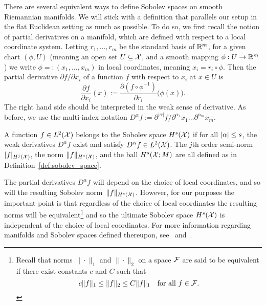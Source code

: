There are several equivalent ways to define Sobolev spaces on smooth Riemannian manifolds. We will stick with a definition that parallels our setup in the flat Euclidean setting as much as possible. To do so, we first recall the notion of partial derivatives on a manifold, which are defined with respect to a local coordinate system. Letting $r_1,\ldots,r_m$ be the standard basis of $\mathbb{R}^m$, for a given chart $(\phi,U)$ (meaning an open set $U \subseteq \mathcal{X}$, and a smooth mapping $\phi: U \to \mathbb{R}^m$) we write $\phi =: (x_1,\ldots,x_m)$ in local coordinates, meaning $x_i = r_i \circ \phi$. Then the partial derivative $\partial f/\partial x_i$ of a function $f$ with respect to $x_i$ at $x \in U$ is
\begin{equation*}
\frac{\partial f}{\partial x_i}(x) := \frac{\partial(f \circ \phi^{-1})}{\partial r_i}\bigl(\phi(x)\bigr).
\end{equation*}
The right hand side should be interpreted in the weak sense of derivative. As before, we use the multi-index notation $D^{\alpha}f := \partial^{|\alpha|}f/\partial^{\alpha_1}x_1\ldots\partial^{\alpha_m}x_m$. 

\begin{definition}
	\label{def:sobolev_space_manifold}
	A function $f \in L^2(\mathcal{X})$ belongs to the Sobolev space $H^{s}(\mathcal{X})$ if for all $\left \lvert \alpha \right \rvert \leq s$, the weak derivatives $D^{\alpha}f$ exist and satisfy  $D^{\alpha}f \in L^2(\mathcal{X})$. The $j$th order semi-norm $|f|_{H^j(\mathcal{X})}$, the norm $\|f\|_{H^s(\mathcal{X})}$, and the ball $H^s(\mathcal{X};M)$ are all defined as in Definition~\ref{def:sobolev_space}.
\end{definition}
The partial derivatives $D^{\alpha}f$ will depend on the choice of local coordinates, and so will the resulting Sobolev norm~$\|f\|_{H^s(\mathcal{X})}$. However, for our purposes the important point is that regardless of the choice of local coordinates the resulting norms will be equivalent\footnote{Recall that norms $\|\cdot\|_1$ and $\|\cdot\|_2$ on a space $\mathcal{F}$ are said to be equivalent if there exist constants $c$ and $C$ such that
	\begin{equation*}
	c \|f\|_1 \leq \|f\|_2 \leq C \|f\|_1 \quad \textrm{for all $f \in \mathcal{F}$.}
	\end{equation*}} 
and so the ultimate Sobolev space $H^s(\mathcal{X})$ is independent of the choice of local coordinates. For more information regarding manifolds and Sobolev spaces defined thereupon, see~\cite{lee2013} and~\cite{hebey1996}.

